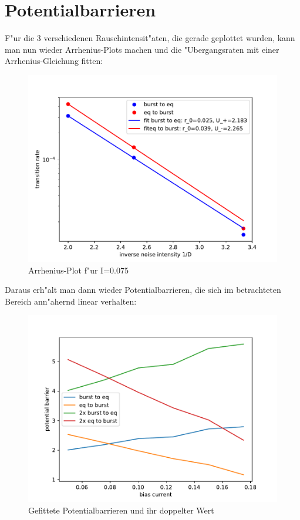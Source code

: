 \documentclass[12pt,a4paper]{article}
\begin{document}
\section{Potentialbarrieren}
F"ur die 3 verschiedenen Rauschintensit"aten, die gerade geplottet wurden, kann man nun wieder Arrhenius-Plots machen und die "Ubergangsraten mit einer Arrhenius-Gleichung fitten:
\begin{figure}[H]
	\centering
	\includegraphics[scale=0.9]{arrheniustotrealfast6jjem2fit1.pdf}
	\caption{Arrhenius-Plot f"ur I=0.075}
	\label{arrh}
\end{figure}
Daraus erh"alt man dann wieder Potentialbarrieren, die sich im betrachteten Bereich ann"ahernd linear verhalten:
\begin{figure}[H]
	\centering
	\includegraphics[scale=0.9]{barrier2realfast6jjem2.pdf}
	\caption{Gefittete Potentialbarrieren und ihr doppelter Wert}
	\label{potbar}
\end{figure}
\end{document}
